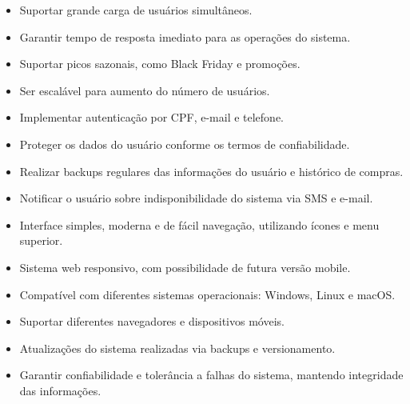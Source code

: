 \begin{itemize}
    \item Suportar grande carga de usuários simultâneos.
    \item Garantir tempo de resposta imediato para as operações do sistema.
    \item Suportar picos sazonais, como Black Friday e promoções.
    \item Ser escalável para aumento do número de usuários.
    \item Implementar autenticação por CPF, e-mail e telefone.
    \item Proteger os dados do usuário conforme os termos de confiabilidade.
    \item Realizar backups regulares das informações do usuário e histórico de compras.
    \item Notificar o usuário sobre indisponibilidade do sistema via SMS e e-mail.
    \item Interface simples, moderna e de fácil navegação, utilizando ícones e menu superior.
    \item Sistema web responsivo, com possibilidade de futura versão mobile.
    \item Compatível com diferentes sistemas operacionais: Windows, Linux e macOS.
    \item Suportar diferentes navegadores e dispositivos móveis.
    \item Atualizações do sistema realizadas via backups e versionamento.
    \item Garantir confiabilidade e tolerância a falhas do sistema, mantendo integridade das informações.
\end{itemize} 